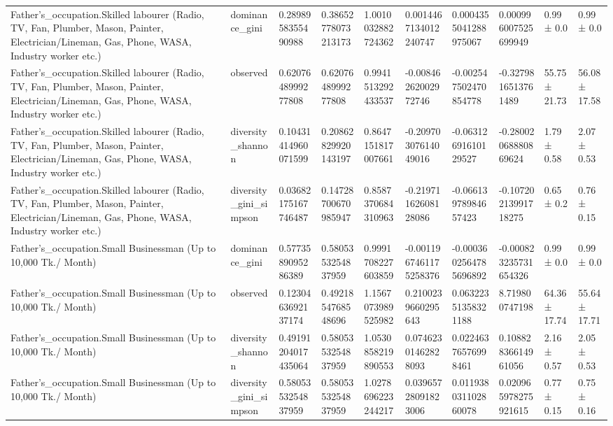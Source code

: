 \begin{longtable}{llllllllll}
Father’s\_occupation.Skilled labourer (Radio, TV, Fan, Plumber, Mason, Painter, Electrician/Lineman, Gas, Phone, WASA, Industry worker etc.) & dominance\_gini & 0.2898958355490988 & 0.38652778073213173 & 1.0010032882724362 & 0.0014467134012240747 & 0.0004355041288975067 & 0.000996007525699949 & 0.99 ± 0.0 & 0.99 ± 0.0 \\
Father’s\_occupation.Skilled labourer (Radio, TV, Fan, Plumber, Mason, Painter, Electrician/Lineman, Gas, Phone, WASA, Industry worker etc.) & observed & 0.6207648999277808 & 0.6207648999277808 & 0.9941513292433537 & -0.00846262002972746 & -0.002547502470854778 & -0.3279816513761489 & 55.75 ± 21.73 & 56.08 ± 17.58 \\
Father’s\_occupation.Skilled labourer (Radio, TV, Fan, Plumber, Mason, Painter, Electrician/Lineman, Gas, Phone, WASA, Industry worker etc.) & diversity\_shannon & 0.10431414960071599 & 0.20862829920143197 & 0.8647151817007661 & -0.20970307614049016 & -0.06312691610129527 & -0.28002068880869624 & 1.79 ± 0.58 & 2.07 ± 0.53 \\
Father’s\_occupation.Skilled labourer (Radio, TV, Fan, Plumber, Mason, Painter, Electrician/Lineman, Gas, Phone, WASA, Industry worker etc.) & diversity\_gini\_simpson & 0.03682175167746487 & 0.14728700670985947 & 0.8587370684310963 & -0.21971162608128086 & -0.06613978984657423 & -0.10720213991718275 & 0.65 ± 0.2 & 0.76 ± 0.15 \\
Father’s\_occupation.Small Businessman (Up to 10,000 Tk./ Month) & dominance\_gini & 0.5773589095286389 & 0.5805353254837959 & 0.9991708227603859 & -0.0011967461175258376 & -0.0003602564785696892 & -0.000823235731654326 & 0.99 ± 0.0 & 0.99 ± 0.0 \\
Father’s\_occupation.Small Businessman (Up to 10,000 Tk./ Month) & observed & 0.1230463692137174 & 0.4921854768548696 & 1.1567073989525982 & 0.2100239660295643 & 0.06322351358321188 & 8.719800747198 & 64.36 ± 17.74 & 55.64 ± 17.71 \\
Father’s\_occupation.Small Businessman (Up to 10,000 Tk./ Month) & diversity\_shannon & 0.49191204017435064 & 0.5805353254837959 & 1.0530858219890553 & 0.07462301462828093 & 0.02246376576998461 & 0.10882836614961056 & 2.16 ± 0.57 & 2.05 ± 0.53 \\
Father’s\_occupation.Small Businessman (Up to 10,000 Tk./ Month) & diversity\_gini\_simpson & 0.5805353254837959 & 0.5805353254837959 & 1.0278696223244217 & 0.03965728091823006 & 0.011938031102860078 & 0.020965978275921615 & 0.77 ± 0.15 & 0.75 ± 0.16 \\

\end{longtable}
